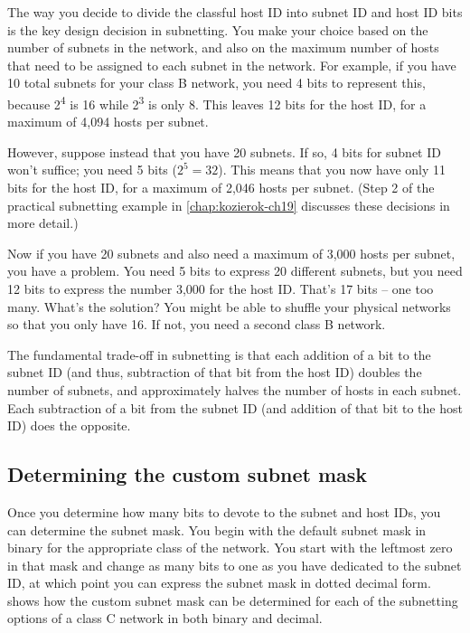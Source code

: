 The way you decide to divide the classful host ID into subnet ID and
host ID bits is the key design decision in subnetting. You make your
choice based on the number of subnets in the network, and also on the
maximum number of hosts that need to be assigned to each subnet in the
network. For example, if you have 10 total subnets for your class B
network, you need 4 bits to represent this, because 2\textsuperscript{4}
is 16 while 2\textsuperscript{3} is only 8. This leaves 12 bits for the
host ID, for a maximum of 4,094 hosts per subnet.

However, suppose instead that you have 20 subnets. If so, 4 bits for
subnet ID won't suffice; you need 5 bits ($2^{5}=32$).
This means that you now have only 11 bits for the host ID, for a maximum of 2,046 hosts per subnet.
(Step 2 of the practical subnetting example in \vref{chap:kozierok-ch19} discusses these decisions in more detail.)

Now if you have 20 subnets and also need a maximum of 3,000 hosts per
subnet, you have a problem. You need 5 bits to express 20 different
subnets, but you need 12 bits to express the number 3,000 for the host
ID. That's 17 bits -- one too many. What's the solution? You might be able to
shuffle your physical networks so that you only have 16. If not, you
need a second class B network.

\begin{keyconcept}
The fundamental trade-off in subnetting is that each addition of a bit to the subnet ID (and thus, subtraction of that bit from the host ID)
doubles the number of subnets, and approximately halves the number of hosts in each subnet.
Each subtraction of a bit from the subnet ID (and addition of that bit to the host ID) does the opposite.
\end{keyconcept}


\subsection{Determining the custom subnet mask}

Once you determine how many bits to devote to the subnet and host IDs,
you can determine the subnet mask. You begin with the default subnet
mask in binary for the appropriate class of the network. You start with
the leftmost zero in that mask and change as many bits to one as you
have dedicated to the subnet ID, at which point you can express the subnet mask in dotted decimal form.
 shows how the custom subnet mask can be determined for each of the
subnetting options of a class C network in both binary and decimal.

